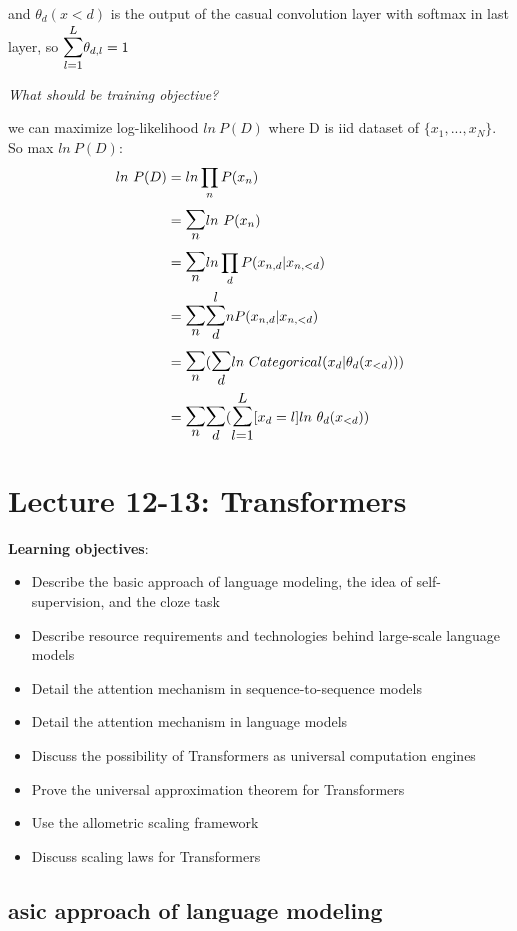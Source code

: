 \documentclass[12pt,a4paper]{article}
\begin{document}
and $\theta_d(x<d)$ is the output of the casual convolution layer with softmax in last layer, so $\bsum{l=1}{L}\theta_{d,l}=1$

\vspace{0.5cm}
\textit{What should be training objective?}

we can maximize log-likelihood $ln\ P(D)$ where D is iid dataset of $\{x_1,...,x_N\}$. So max $ln\ P(D)$:\\
\begin{equation*}
    \begin{split}
ln\ P(D) &= ln\prod_nP(x_n)\\
&=\bsum{n}{} ln\ P(x_n)\\
&=\bsum{n}{} ln\prod_dP(x_{n,d}|x_{n,<d})\\
&=\bsum{n}{} \bsum{d} ln P(x_{n,d}|x_{n,<d})\\
&=\bsum{n}{} (\bsum{d}{} ln\ Categorical(x_d|\theta_d(x_{<d})))\\
&=\bsum{n}{}\bsum{d}{}(\bsum{l=1}{L}[x_d=l]ln\ \theta_d(x_{<d}))\\
    \end{split}
\end{equation*}

\section{Lecture 12-13: Transformers}
\textbf{Learning objectives}: 
\begin{itemize}
    \item Describe the basic approach of language modeling, the idea of self-supervision, and the cloze task
    \item Describe resource requirements and technologies behind large-scale language models
    \item Detail the attention mechanism in sequence-to-sequence models
    \item Detail the attention mechanism in language models
    \item Discuss the possibility of Transformers as universal computation engines
    \item Prove the universal approximation theorem for Transformers
    \item Use the allometric scaling framework
    \item Discuss scaling laws for Transformers
\end{itemize}

\subsection{asic approach of language modeling}
\end{document}
